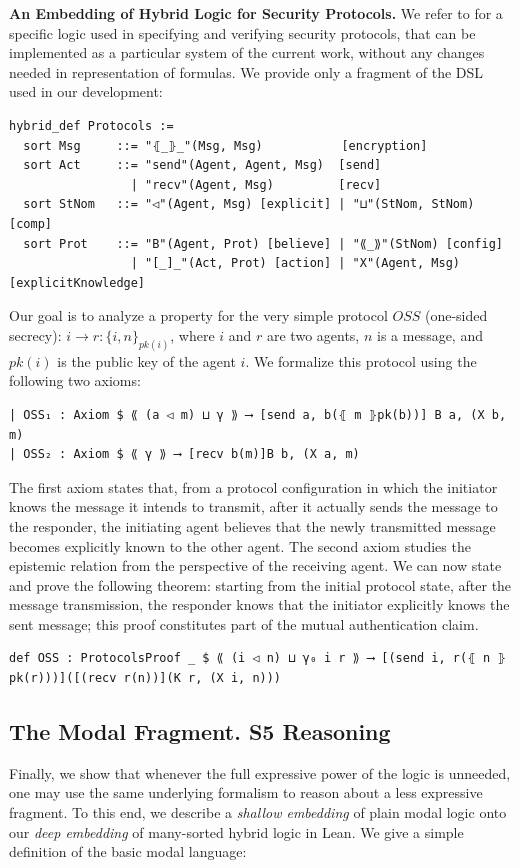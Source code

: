 \documentclass{easychair}
\theoremstyle{remark}
\begin{document}
{\bf An Embedding of Hybrid Logic for Security Protocols.} We refer to \cite{ramics} for a specific logic used in specifying and verifying security protocols, that can be implemented as a particular system of the current work, without any changes needed in representation of formulas. We provide only a fragment of the DSL used in our development: 
\begin{lstlisting}
hybrid_def Protocols :=
  sort Msg     ::= "⦃_⦄_"(Msg, Msg)           [encryption]
  sort Act     ::= "send"(Agent, Agent, Msg)  [send]
                 | "recv"(Agent, Msg)         [recv]
  sort StNom   ::= "◁"(Agent, Msg) [explicit] | "⊔"(StNom, StNom) [comp]
  sort Prot    ::= "B"(Agent, Prot) [believe] | "⟪_⟫"(StNom) [config]
                 | "[_]_"(Act, Prot) [action] | "X"(Agent, Msg) [explicitKnowledge]
\end{lstlisting}

Our goal  is to analyze a property for the  very simple protocol $OSS$ (one-sided secrecy):  $i \longrightarrow r: \{ i, n \}_{pk(i)}$, where $i$ and $r$ are two agents, $n$ is a message, and $pk(i)$ is the public key of the agent $i$. 
We formalize this protocol using the following two axioms: 
\begin{lstlisting}
| OSS₁ : Axiom $ ⟪ (a ◁ m) ⊔ γ ⟫ ⟶ [send a, b(⦃ m ⦄pk(b))] B a, (X b, m)
| OSS₂ : Axiom $ ⟪ γ ⟫ ⟶ [recv b(m)]B b, (X a, m)
\end{lstlisting}

The first axiom states that, from a protocol configuration in which the initiator knows the message it intends to transmit, after it actually sends the message to the responder, the initiating agent believes that the newly transmitted message becomes explicitly known to the other agent. The second axiom studies the epistemic relation from the perspective of the receiving agent.
We can now state and prove the following theorem: starting from the initial protocol state, after the  message transmission, the responder knows that the initiator explicitly knows the sent message; this proof constitutes part of the mutual authentication claim. 

\begin{lstlisting}
def OSS : ProtocolsProof _ $ ⟪ (i ◁ n) ⊔ γ₀ i r ⟫ ⟶ [(send i, r(⦃ n ⦄pk(r)))]([(recv r(n))](K r, (X i, n)))
\end{lstlisting}

\subsection{The Modal Fragment. S5 Reasoning}
Finally, we show that whenever the full expressive power of the logic is unneeded, one may use the same underlying formalism to reason about a less expressive fragment. To this end, we describe a \textit{shallow embedding} of plain modal logic onto our \textit{deep embedding} of many-sorted hybrid logic in Lean. We give a simple definition of the basic modal language:
\end{document}
